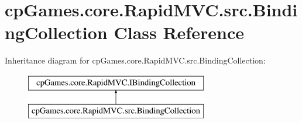 \hypertarget{classcp_games_1_1core_1_1_rapid_m_v_c_1_1src_1_1_binding_collection}{}\section{cp\+Games.\+core.\+Rapid\+M\+V\+C.\+src.\+Binding\+Collection Class Reference}
\label{classcp_games_1_1core_1_1_rapid_m_v_c_1_1src_1_1_binding_collection}
Inheritance diagram for cp\+Games.\+core.\+Rapid\+M\+V\+C.\+src.\+Binding\+Collection\+:\begin{figure}[H]
\begin{center}
\leavevmode
\includegraphics[height=2.000000cm]{classcp_games_1_1core_1_1_rapid_m_v_c_1_1src_1_1_binding_collection}
\end{center}
\end{figure}
